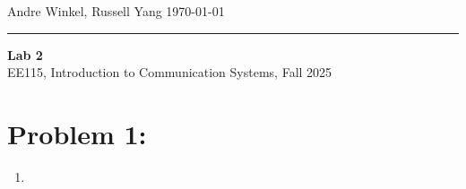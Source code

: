 \documentclass[11pt]{article}
\begin{document}
\noindent Andre Winkel, Russell Yang \hfill \today \\
\rule{\textwidth}{0.4pt}

\begin{center} \large {\textbf{Lab 2}} \\[0em] {EE115, Introduction to Communication Systems, Fall 2025} \end{center}

\section{Problem 1: }
\begin{enumerate}[label=\textbf{\alph*)}, leftmargin=2.6em]
    \item 
\end{enumerate}
\end{document}
